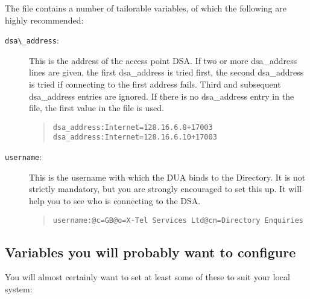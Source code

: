 The  file 
contains a number of tailorable variables, of which the
following are highly recommended:

\begin{description}

\item [\verb+dsa\_address+:] This is the address of the access point DSA.
If two or more dsa\_address lines are given, the first dsa\_address is tried
first, the second dsa\_address is tried if connecting to the first address
fails.  Third and subsequent dsa\_address entries are ignored. If there is no
dsa\_address entry in the  file, the first value in the
 file is used.

\begin{quote}\small\begin{verbatim}
dsa_address:Internet=128.16.6.8+17003
dsa_address:Internet=128.16.6.10+17003
\end{verbatim}\end{quote}

\item [\verb+username+:] This is the username with which the DUA binds to 
the Directory.  It is not strictly mandatory, but you are strongly encouraged
to set this up.  It will help you to see who is connecting to the DSA.

\begin{quote}\footnotesize\begin{verbatim}
username:@c=GB@o=X-Tel Services Ltd@cn=Directory Enquiries
\end{verbatim}\end{quote}

\end{description}

\subsection{Variables you will probably want to configure}

You will almost certainly want to set at least some of these to suit your 
local system:

